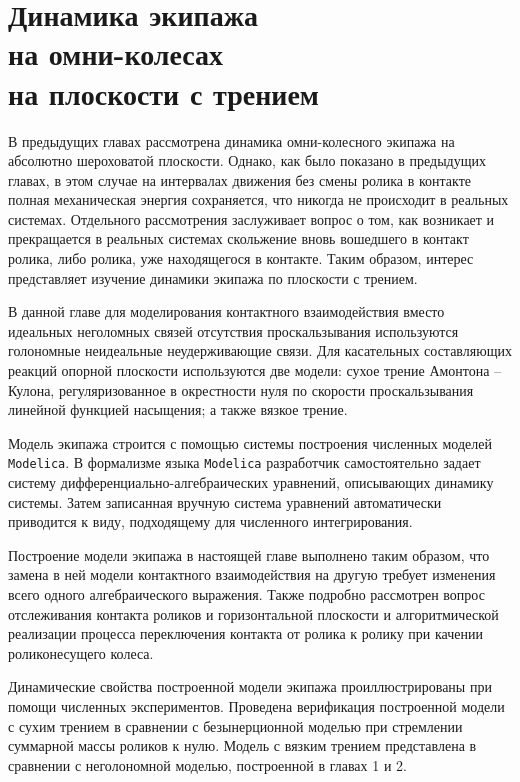 \chapter{Динамика экипажа \\ на омни-колесах \\ на плоскости с трением}


В предыдущих главах рассмотрена динамика омни-колесного экипажа на абсолютно шероховатой плоскости. Однако, как было показано в предыдущих главах, в этом случае на интервалах движения без смены ролика в контакте полная механическая энергия сохраняется, что никогда не происходит в реальных системах.
Отдельного рассмотрения заслуживает вопрос о том, как возникает и прекращается в реальных системах скольжение вновь вошедшего в контакт ролика, либо ролика, уже находящегося в контакте.
Таким образом, интерес представляет изучение динамики экипажа по плоскости с трением.

В данной главе для моделирования контактного взаимодействия вместо идеальных неголомных связей отсутствия проскальзывания используются голономные неидеальные неудерживающие связи. Для касательных составляющих реакций опорной плоскости используются две модели: сухое трение Амонтона -- Кулона, регуляризованное в окрестности нуля по скорости проскальзывания линейной функцией насыщения; а также вязкое трение.

Модель экипажа строится с помощью системы построения численных моделей \texttt{Modelica}. В формализме языка \texttt{Modelica} разработчик самостоятельно задает систему дифференциально-алгебраических уравнений, описывающих динамику системы. Затем записанная вручную система уравнений автоматически приводится к виду, подходящему для численного интегрирования.

Построение модели экипажа в настоящей главе выполнено таким образом, что замена в ней модели контактного взаимодействия на другую требует изменения всего одного алгебраического выражения. Также подробно рассмотрен вопрос отслеживания контакта роликов и горизонтальной плоскости и алгоритмической реализации процесса переключения контакта от ролика к ролику при качении  роликонесущего колеса.

Динамические свойства построенной модели экипажа проиллюстрированы при помощи численных экспериментов. Проведена верификация построенной модели с сухим трением в сравнении с безынерционной моделью при стремлении суммарной массы роликов к нулю. Модель с вязким трением представлена в сравнении с неголономной моделью, построенной в главах 1 и 2.